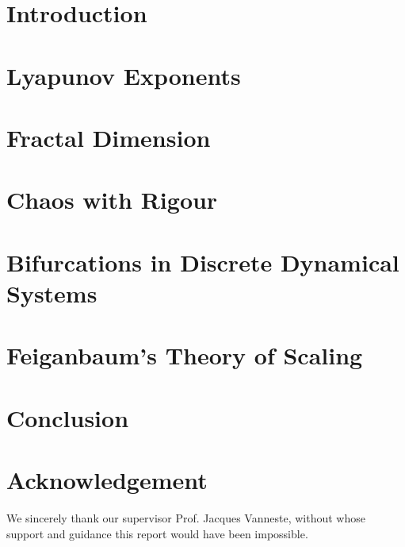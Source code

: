 \documentclass[12pt,oneside]{report}
\begin{document}
\maketitle


\declaration
\dedication{Musa mihi causas memora ...\\
	Muse, tell me the causes ...
}

\tableofcontents
\newpage
{}

\chapter*{Introduction}


\chapter{Lyapunov Exponents}

\chapter{Fractal Dimension}


\chapter{Chaos with Rigour}\label{chapter:chaos_with_rigor}


\chapter{Bifurcations in Discrete Dynamical Systems}\label{chapter:bifurcation}


\chapter{Feiganbaum's Theory of Scaling}


\chapter*{Conclusion}


\chapter*{Acknowledgement}
We sincerely thank our supervisor Prof. Jacques Vanneste, without whose support and guidance this report would have been impossible.
%  
\printbibliography
{}
\end{document}
